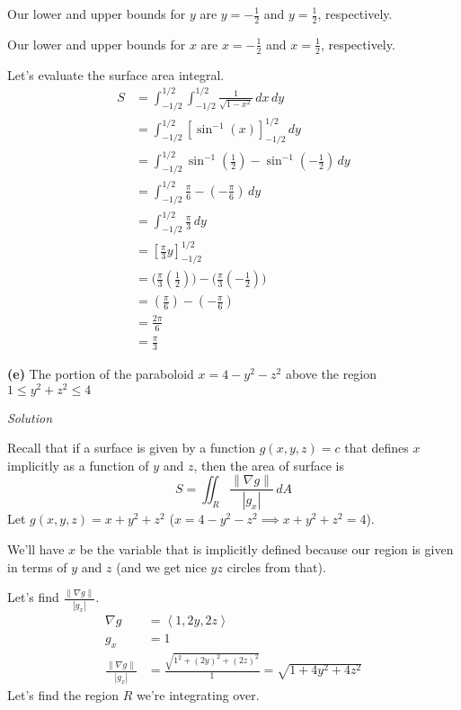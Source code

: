 \documentclass{article}
\newcommand{\lrp}[1]{\left( #1 \right)}
\newcommand{\lra}[1]{\left\langle #1 \right\rangle}
\newcommand{\lrb}[1]{\left[ #1 \right]}
\newcommand{\norm}[1]{\left\lVert #1 \right\rVert}
\newcommand{\Solution}{\textit{Solution}}
\begin{document}
Our lower and upper bounds for $y$ are $y=-\frac{1}{2}$ and $y=\frac{1}{2}$, respectively.

Our lower and upper bounds for $x$ are $x=-\frac{1}{2}$ and $x=\frac{1}{2}$, respectively.

Let's evaluate the surface area integral.
\begin{align*}
   S&= \int_{-1/2}^{1/2}\int_{-1/2}^{1/2}\frac{1}{\sqrt{1-x^2}}\,dx\,dy\\
    &=\int_{-1/2}^{1/2}\lrb{\sin^{-1}(x)}_{-1/2}^{1/2}\,dy\\
    &=\int_{-1/2}^{1/2}\sin^{-1}\lrp{\frac{1}{2}}-\sin^{-1}\lrp{-\frac{1}{2}}\,dy\\
    &=\int_{-1/2}^{1/2}\frac{\pi}{6}-\lrp{-\frac{\pi}{6}}\,dy\\
    &=\int_{-1/2}^{1/2}\frac{\pi}{3}\,dy\\
    &=\lrb{\frac{\pi}{3}y}_{-1/2}^{1/2}\\
    &=\Bigg(\frac{\pi}{3}\lrp{\frac{1}{2}}\Bigg)-\Bigg(\frac{\pi}{3}\lrp{-\frac{1}{2}}\Bigg)\\
    &=\lrp{\frac{\pi}{6}}-\lrp{-\frac{\pi}{6}}\\
    &=\frac{2\pi}{6}\\
    &=\boxed{\frac{\pi}{3}}
\end{align*}

{}\textbf{(e)} The portion of the paraboloid $x=4-y^2-z^2$ above the region $1\leq y^2+z^2\leq 4$

\Solution

Recall that if a surface is given by a function $g(x,y,z)=c$ that defines $x$ implicitly as a function of $y$ and $z$, then the area of surface is
\begin{equation*}
    S=\iint_R \frac{\norm{\nabla g}}{\left| g_x\right|}\,dA
\end{equation*}
Let $g(x,y,z)=x+y^2+z^2$ ($x=4-y^2-z^2\implies x+y^2+z^2=4$). 

We'll have $x$ be the variable that is implicitly defined because our region is given in terms of $y$ and $z$ (and we get nice $yz$ circles from that).

Let's find $\displaystyle\frac{\norm{\nabla g}}{\left| g_x\right|} $.
\begin{align*}
    \nabla g &=\lra{1,2y,2z}\\
    g_x&=1\\
    \frac{\norm{\nabla g}}{\left|g_x\right|}&=\frac{\sqrt{1^2+(2y)^2+(2z)^2}}{1}=\sqrt{1+4y^2+4z^2}
\end{align*}
Let's find the region $R$ we're integrating over.
\end{document}
